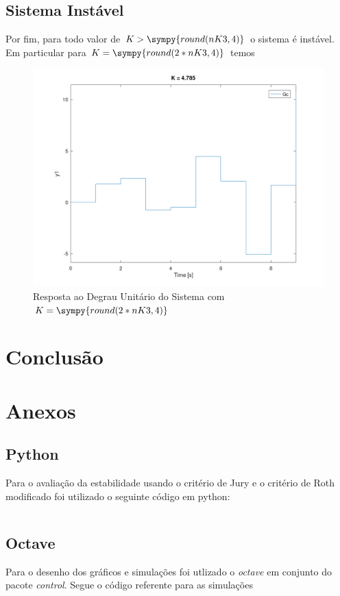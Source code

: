 \documentclass[a4paper,11pt]{article}
\newcommand{\npy}[1]{\sympy{round(#1,4)}}
\begin{document}
\subsection{Sistema Instável}

Por fim, para todo valor de $K > \npy{nK3}$ o sistema é instável. Em particular para $K = \npy{2*nK3}$ temos

\begin{figure}[H]
    \centering
    \includegraphics[width=0.8\linewidth]{img/exsim1-plot-instable.png}
    \caption{Resposta ao Degrau Unitário do Sistema com $K = \npy{2*nK3}$}
\end{figure}


\section{Conclusão}




\nocite{sympy}



\section{Anexos}
\subsection{Python}

Para o avaliação da estabilidade usando o critério de Jury e o critério de Roth modificado foi utilizado o seguinte código em python:

\inputminted{matlab}{../python/exsim1.py}

\subsection{Octave}

Para o desenho dos gráficos e simulações foi utlizado o \textit{octave} em conjunto do pacote \textit{control}. Segue o código referente para as simulações

\inputminted{matlab}{../matlab/exsim1.m}


\end{document}
